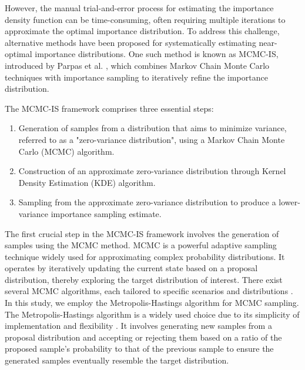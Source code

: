        However, the manual trial-and-error process for estimating the importance density function can be time-consuming, often requiring multiple iterations to approximate the optimal importance distribution. To address this challenge, alternative methods have been proposed for systematically estimating near-optimal importance distributions. One such method is known as MCMC-IS, introduced by Parpas et al. \cite{parpas_importance_2015}, which combines Markov Chain Monte Carlo techniques with importance sampling to iteratively refine the importance distribution.

        The MCMC-IS framework comprises three essential steps:
        \begin{enumerate}
            \item Generation of samples from a distribution that aims to minimize variance, referred to as a "zero-variance distribution", using a Markov Chain Monte Carlo (MCMC) algorithm.
            \item Construction of an approximate zero-variance distribution through Kernel Density Estimation (KDE) algorithm.
            \item Sampling from the approximate zero-variance distribution to produce a lower-variance importance sampling estimate.
        \end{enumerate}

        The first crucial step in the MCMC-IS framework involves the generation of samples using the MCMC method. MCMC is a powerful adaptive sampling technique widely used for approximating complex probability distributions. It operates by iteratively updating the current state based on a proposal distribution, thereby exploring the target distribution of interest. There exist several MCMC algorithms, each tailored to specific scenarios and distributions \cite{gelman_handbook_2010}. In this study, we employ the Metropolis-Hastings algorithm for MCMC sampling. The Metropolis-Hastings algorithm is a widely used choice due to its simplicity of implementation and flexibility \cite{parpas_importance_2015}. It involves generating new samples from a proposal distribution and accepting or rejecting them based on a ratio of the proposed sample's probability to that of the previous sample to ensure the generated samples eventually resemble the target distribution.
        
